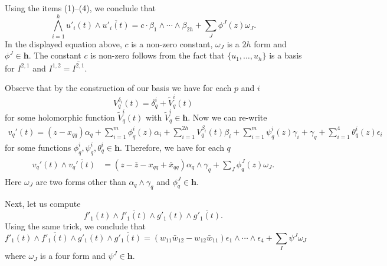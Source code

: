 Using the items (1)--(4), we conclude that
\begin{equation}
\label{eq:dominant-term-in-middle-hs}
\bigwedge_{i=1}^{h} u'_{i}(t)\wedge\overline{u'_{i}(t)}=
c\cdot\beta_{1}\wedge\cdots\wedge\beta_{2h} + \sum_{J} \phi^{J}(z)\omega_{J}.
\end{equation}
In the displayed equation above, \(c\) is a non-zero constant, \(\omega_{J}\)
is a \(2h\) form and \(\phi^{J}\in\mathbf{h}\).
The constant \(c\) is non-zero follows from the fact that 
\(\{u_{1},\ldots,u_{h}\}\) is a basis for \(I^{2,1}\) and 
\(I^{1,2}=\overline{I^{2,1}}\).

Observe that by the construction of our basis we have for each \(p\) and \(i\)
\begin{equation}
V_{q}^{\delta_{i}}(t)=\delta_{q}^{i}+\tilde{V}_{q}^{i}(t)
\end{equation}
for some holomorphic function \(\tilde{V}_{q}^{i}(t)\) with 
\(\tilde{V}_{q}^{i}\in\mathbf{h}\). 
Now we can re-write
\begin{align*}
v_{q}'(t)=(z-x_{qq})\alpha_{q}+\sum_{i=1}^{m}\phi^{i}_{q}(z)\alpha_{i}
+\sum_{i=1}^{2h} V^{\beta_{i}}_{q}(t) \beta_{i} + \sum_{i=1}^{m} 
\psi_{q}^{i}(z) \gamma_{i} + \gamma_{q} + \sum_{i=1}^{4}\theta_{q}^{i}(z)\epsilon_{i}
\end{align*}
for some functions \(\phi_{q}^{i},\psi_{q}^{i},\theta_{q}^{i}\in\mathbf{h}\). Therefore,
we have for each \(q\)
\begin{align}
\label{eq:dominant-2-2-hs}
\begin{split}
v_{q}'(t)\wedge\overline{v_{q}'(t)} & = (z-\bar{z}-x_{qq}+\bar{x}_{qq})
\alpha_{q}\wedge\gamma_{q} + \sum_{J}\phi_{q}^{J}(z)\omega_{J}.
\end{split}
\end{align}
Here \(\omega_{J}\) are two forms other than \(\alpha_{q}\wedge\gamma_{q}\)
and \(\phi_{q}^{J}\in \mathbf{h}\).

Next, let us compute
\begin{equation}
f'_{1}(t)\wedge\overline{f'_{1}(t)}\wedge
g'_{1}(t)\wedge\overline{g'_{1}(t)}.
\end{equation}
Using the same trick, we conclude that
\begin{equation}
f'_{1}(t)\wedge\overline{f'_{1}(t)}\wedge
g'_{1}(t)\wedge\overline{g'_{1}(t)}=(w_{11}\bar{w}_{12}-w_{12}\bar{w}_{11})\epsilon_{1}
\wedge\cdots\wedge \epsilon_{4} + \sum_{I}\psi^{J}\omega_{J}
\end{equation}
where \(\omega_{J}\) is a four form and \(\psi^{J}\in\mathbf{h}\).


